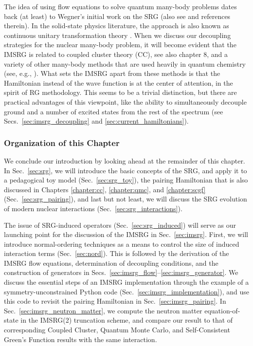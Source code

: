 {The idea of using flow equations to solve quantum many-body problems
dates back (at least) to Wegner's initial work on the SRG \cite{Wegner:1994dk} 
(also see \cite{Kehrein:2006kx} and references therein). In the 
solid-state physics literature, the approach is also known as 
continuous unitary transformation theory  
\cite{Heidbrink:2002kx,Drescher:2011kx,Krull:2012bs,Fauseweh:2013zv,Krones:2015ft}.
When we discuss our decoupling strategies for the nuclear many-body
problem, it will become evident that the IMSRG is related to coupled cluster theory (CC), see also chapter 8,  
and a variety of other many-body methods that are used heavily in 
quantum chemistry (see, e.g., \cite{Shavitt:2009,Hagen:2014ve,White:2002fk,
Yanai:2007kx,Nakatsuji:1976yq,Mukherjee:2001uq,Mazziotti:2006fk,Evangelista:2014rq}).
What sets the IMSRG apart from these methods is that the Hamiltonian 
instead of the wave function is at the center of attention, in the
spirit of RG methodology. This seems to be a trivial distinction, but
there are practical advantages of this viewpoint, like the ability to
simultaneously decouple ground and a number of excited states from the
rest of the spectrum (see Secs.~\ref{sec:imsrg_decoupling} and 
\ref{sec:current_hamiltonians}). 


%
%
\subsubsection*{Organization of this Chapter}
We conclude our introduction by looking ahead at the remainder of this
chapter. In Sec.~\ref{sec:srg}, we will introduce the basic concepts of
the SRG, and apply it to a pedagogical toy model
(Sec.~\ref{sec:srg_toy}), the pairing Hamiltonian that is also discussed 
in Chapters \ref{chapter:cc}, \ref{chapter:qmc}, and \ref{chapter:scgf} 
(Sec.~\ref{sec:srg_pairing}), and last but not least, we will discuss the 
SRG evolution of modern nuclear interactions (Sec.~\ref{sec:srg_interactions}). 

The issue of SRG-induced operators (Sec.~\ref{sec:srg_induced}) will serve 
as our launching point for the discussion of the IMSRG in Sec.~\ref{sec:imsrg}.
First, we will introduce normal-ordering techniques as a means to control the 
size of induced interaction terms (Sec.~\ref{sec:nord}). This is followed
by the derivation of the IMSRG flow equations, determination of decoupling
conditions, and the construction of generators in Secs.~\ref{sec:imsrg_flow}--\ref{sec:imsrg_generator}.
We discuss the essential steps of an IMSRG implementation through the 
example of a symmetry-unconstrained Python code (Sec.~\ref{sec:imsrg_implementation}), 
and use this code to revisit the pairing Hamiltonian in Sec.~\ref{sec:imsrg_pairing}.
In Sec.~\ref{sec:imsrg_neutron_matter}, we compute the neutron matter 
equation-of-state in the IMSRG(2) truncation scheme, and compare our result
to that of corresponding Coupled Cluster, Quantum Monte Carlo, and Self-Consistent 
Green's Function results with the same interaction. 

}
